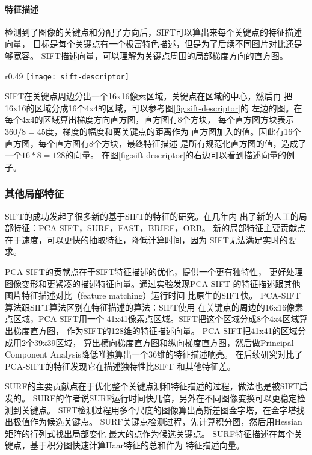 \paragraph*{特征描述}
检测到了图像的关键点和分配了方向后，SIFT可以算出来每个关键点的特征描述向量，
目标是每个关键点有一个极富特色描述，但是为了后续不同图片对比还是够宽容。
SIFT描述向量，可以理解为关键点周围的局部梯度方向的直方图。

\begin{wrapfigure}{r}{0.49\textwidth}
  \centering
    \texttt{[image: sift-descriptor]}
    \caption{SIFT特征描述。源：Cornell CS664}
  \label{fig:sift-descriptor}
\end{wrapfigure}
SIFT在关键点周边分出一个16x16像素区域，关键点在区域的中心，然后再
把16x16的区域分成16个4x4的区域，可以参考图\ref{fig:sift-descriptor}的
左边的图。在每个4x4的区域算出梯度方向直方图，直方图有8个方块，
每个直方图方块表示$360 / 8 = 45$度，梯度的幅度和离关键点的距离作为
直方图加入的值。因此有16个直方图，每个直方图有8个方块，最终特征描述
是所有规范化直方图的值，造成了一个$16 * 8 = 128$的向量。
在图\ref{fig:sift-descriptor}的右边可以看到描述向量的例子。


\subsubsection{其他局部特征}
SIFT的成功发起了很多新的基于SIFT的特征的研究。在几年内
出了新的人工的局部特征：PCA-SIFT，SURF，FAST，BRIEF，ORB。
\cite{ke2004pca, bay2006surf, fast2006machine, calonder2010brief, rublee2011orb}
新的局部特征主要贡献点在于速度，可以更快的抽取特征，降低计算时间，因为
SIFT无法满足实时的要求。\cite{juan2009comparison, calonder2010brief}

PCA-SIFT的贡献点在于SIFT特征描述的优化，提供一个更有独特性，
更好处理图像变形和更紧凑的描述特征向量。通过实验发现PCA-SIFT
的特征描述跟其他图片特征描述对比（feature matching）运行时间
比原生的SIFT快。\cite{ke2004pca}
PCA-SIFT算法跟SIFT算法区别在特征描述的算法：SIFT使用
在关键点的周边的16x16像素点区域，PCA-SIFT用一个
41x41像素点区域。SIFT把这个区域分成8个4x4区域算出梯度直方图，
作为SIFT的128维的特征描述向量。
PCA-SIFT把41x41的区域分成用2个39x39区域，
算出横向梯度直方图和纵向梯度直方图，然后做Principal Component
Analysis降低唯独算出一个36维的特征描述响亮。
在后续研究对比了PCA-SIFT的特征发现它在描述独特性比SIFT
和其他特征差。\cite{mikolajczyk2005performance}

SURF的主要贡献点在于优化整个关键点测和特征描述的过程，做法也是被SIFT启发的。
SURF的作者说SURF运行时间快几倍，另外在不同图像变换可以更稳定检测到关键点。\cite{bay2006surf}
SIFT检测过程用多个尺度的图像算出高斯差图金字塔，在金字塔找出极值作为候选关键点。
SURF关键点检测过程，先计算积分图，然后用Hessian矩阵的行列式找出局部变化
最大的点作为候选关键点。
SURF特征描述在每个关键点，基于积分图快速计算Haar特征的总和作为
特征描述向量。

